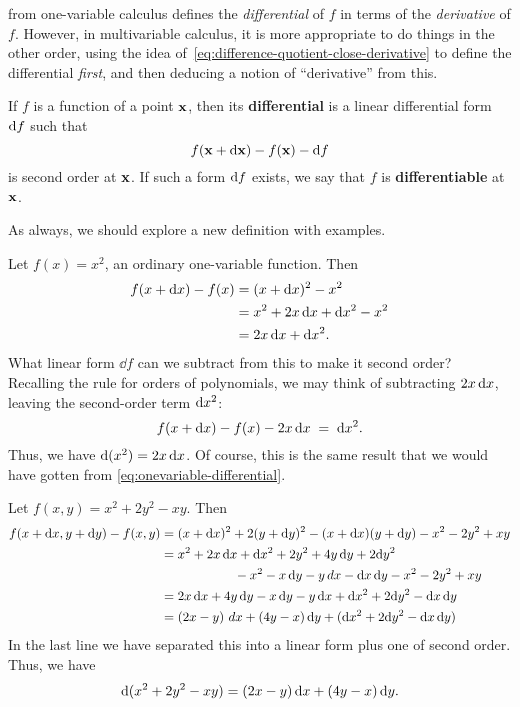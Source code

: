 \documentclass[12pt]{amsart}
\begin{document}
 from one-variable calculus defines the \emph{differential} of $f$ in terms of the \emph{derivative} of $f$.
However, in multivariable calculus, it is more appropriate to do things in the other order, using the idea of~\cref{eq:difference-quotient-close-derivative} to define the differential \emph{first}, and then deducing a notion of ``derivative'' from this.

\begin{defn}\label{def:differential}
  If $f$ is a function of a point $\mathbf{x}$, then its \textbf{differential} is a linear differential form $\mathrm{d} f$ such that
  \[ f(\mathbf{x} + \mathrm{d}\mathbf{x}) - f(\mathbf{x}) - \mathrm{d} f \]
  is second order at $\mathbf{x}$.
  If such a form $\mathrm{d} f$ exists, we say that $f$ is \textbf{differentiable} at $\mathbf{x}$.
\end{defn}

As always, we should explore a new definition with examples.

\begin{eg}
  Let $f(x) = x^2$, an ordinary one-variable function.
  Then
  \begin{align*}
    f(x + \mathrm{d} x) - f(x) &= (x+\mathrm{d} x)^2 - x^2\\
    &= x^2 + 2 x \, \mathrm{d} x + \mathrm{d} x^2 - x^2\\
    &= 2x \, \mathrm{d} x + \mathrm{d} x ^2.
  \end{align*}
  What linear form $\dd f$ can we subtract from this to make it second order?
  Recalling the rule for orders of polynomials, we may think of subtracting $2x \, \mathrm{d} x$, leaving the second-order term $\mathrm{d} x^2$:
  \[ f(x + \mathrm{d} x) - f(x) - 2x \, \mathrm{d} x \;=\; \mathrm{d} x^2. \]
  Thus, we have $\mathrm{d}(x^2) = 2 x \, \mathrm{d} x$.
  Of course, this is the same result that we would have gotten from \cref{eq:onevariable-differential}.
\end{eg}

\begin{eg}
  Let $f(x,y) = x^2 + 2y^2 - xy$.
  Then
  \begin{align*}
    f(x+\mathrm{d} x,y+\mathrm{d} y) - f(x,y)
    &= (x+\mathrm{d} x)^2 + 2(y+\mathrm{d} y)^2 - (x+\mathrm{d} x)(y+\mathrm{d} y) - x^2 - 2y^2 + xy\\
    &= x^2 + 2 x \, \mathrm{d} x + \mathrm{d} x^2 + 2y^2 + 4y\,\mathrm{d} y + 2\mathrm{d} y^2\\
    & \hspace{2cm} - x^2 - x \, \mathrm{d} y - y \, dx - \mathrm{d} x\, \mathrm{d} y - x^2 - 2y^2 + xy\\
    &= 2x\,\mathrm{d} x + 4y\,\mathrm{d} y - x\,\mathrm{d} y - y\,\mathrm{d} x + \mathrm{d} x^2 + 2\mathrm{d} y^2 - \mathrm{d} x\,\mathrm{d} y\\
    &= (2x-y)\,\,dx + (4y-x)\,\mathrm{d} y + (\mathrm{d} x^2 + 2\mathrm{d} y^2 - \mathrm{d} x\,\mathrm{d} y)
  \end{align*}
  In the last line we have separated this into a linear form plus one of second order.
  Thus, we have
  \[ \mathrm{d}(x^2 + 2y^2 - xy) = (2x-y)\,\mathrm{d} x + (4y-x)\,\mathrm{d} y .\]
\end{eg}
\end{document}

